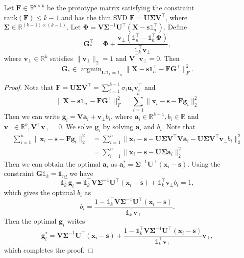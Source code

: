 \documentclass[journal]{IEEEtran}
\begin{document}
%
\begin{Lemma2}
	Let $\mathbf{F}\in\mathbb{R}^{d\times k}$ be the prototype matrix satisfying the constraint $\text{rank}(\mathbf{F}) \leq k-1$ and has the thin SVD $\mathbf{F}=\mathbf{U}\mathbf{\Sigma}\mathbf{V}^\top$, where $\mathbf{\Sigma}\in\mathbb{R}^{(k-1)\times(k-1)}$. Let $ \mathbf{\Phi} = \mathbf{V}\mathbf{\Sigma}^{-1}\mathbf{U}^\top \left(\mathbf{X}-\mathbf{s}\mathbb{1}_n^\top\right)$. Define
	\[
	\mathbf{G}_*^\top = \mathbf{\Phi} 
	+
	\frac{\mathbf{v}_\bot\left(\mathbb{1}_n^\top - \mathbb{1}_k^\top \mathbf{\Phi} \right) }{\mathbb{1}_k^\top\mathbf{v}_\bot },
	\]
	where $\mathbf{v}_\bot \in \mathbb{R}^k$ satisfies $\|\mathbf{v}_\bot\|_2 = 1$ and $\mathbf{V}^\top \mathbf{v}_\bot = 0$.
	Then
	\[
	\mathbf{G}_* \in \mathop{\arg\min}_{\mathbf{G}\mathbb{1}_k = \mathbb{1}_n} \| \mathbf{X} - \mathbf{s}\mathbb{1}_n^\top- \mathbf{FG}^\top\|_F^2.
	\]
\end{Lemma2}
\begin{proof}
	Note that $\mathbf{F} = \mathbf{U}\mathbf{\Sigma}\mathbf{V}^\top = \sum_{i=1}^{k-1}\sigma_i\mathbf{u}_i\mathbf{v}_i^\top$ and
	\[
	\| \mathbf{X} - \mathbf{s}\mathbb{1}_n^\top- \mathbf{FG}^\top\|_F^2 
	= 
	\sum_{i=1}^n \|\mathbf{x}_i - \mathbf{s} - \mathbf{F}\mathbf{g}_i \|_2^2
	\]
	Then we can write $\mathbf{g}_i = \mathbf{V}\mathbf{a}_i + \mathbf{v}_\bot b_i$, where $\mathbf{a}_i \in \mathbb{R}^{k-1}, b_i \in \mathbb{R}$ and 
	$\mathbf{v}_\bot \in \mathbb{R}^k,\mathbf{V}^\top\mathbf{v}_\bot=0$.  We solve $\mathbf{g}_i$ by solving $\mathbf{a}_i$ and $b_i$.
	Note that
	\[
	\begin{aligned}
	\sum_{i=1}^n \|\mathbf{x}_i - \mathbf{s} - \mathbf{F}\mathbf{g}_i \|_2^2
	&=
	\sum_{i=1}^n \|\mathbf{x}_i - \mathbf{s} - \mathbf{U}\mathbf{\Sigma}\mathbf{V}^\top\mathbf{V}\mathbf{a}_i - \mathbf{U}\mathbf{\Sigma}\mathbf{V}^\top \mathbf{v}_\bot b_i \|_2^2\\
	&=
	\sum_{i=1}^n \|\mathbf{x}_i - \mathbf{s} - \mathbf{U}\mathbf{\Sigma}\mathbf{a}_i\|_2^2.
	\end{aligned}
	\]
	Then we can obtain the optimal $\mathbf{a}_i$ as $\mathbf{a}_i^* = \mathbf{\Sigma}^{-1}\mathbf{U}^\top(\mathbf{x}_i-\mathbf{s})$.
	Using the constraint $\mathbf{G}\mathbb{1}_k=\mathbb{1}_n$, we have
	\[
	\mathbb{1}_k^\top \mathbf{g}_i = \mathbb{1}_k^\top \mathbf{V}\mathbf{\Sigma}^{-1}\mathbf{U}^\top(\mathbf{x}_i-\mathbf{s}) + \mathbb{1}_k^\top\mathbf{v}_\bot b_i = 1,
	\]
	which gives the optimal $b_i$ as
	\[
	b_i = \frac{1 - \mathbb{1}_k^\top \mathbf{V}\mathbf{\Sigma}^{-1}\mathbf{U}^\top(\mathbf{x}_i-\mathbf{s})}{\mathbb{1}_k^\top\mathbf{v}_\bot }.
	\]
	Then the optimal $\mathbf{g}_i$ writes
	\[
	\mathbf{g}_i^* = \mathbf{V} \mathbf{\Sigma}^{-1}\mathbf{U}^\top(\mathbf{x}_i-\mathbf{s}) +  \frac{1 - \mathbb{1}_k^\top \mathbf{V}\mathbf{\Sigma}^{-1}\mathbf{U}^\top(\mathbf{x}_i-\mathbf{s})}{\mathbb{1}_k^\top\mathbf{v}_\bot } \mathbf{v}_\bot,
	\]
	which completes the proof.
\end{proof}
\end{document}
